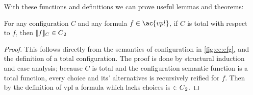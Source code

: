 With these functions and definitions we can prove useful lemmas and theorems:
%
\begin{theorem}
  \label{thm:vpltopl}
  For any configuration $C$ and any formula $f \in \ac{vpl}$, if $C$ is total
  with respect to $f$, then $\sem[C]{f} \in \pl{}$
\end{theorem}
%
\begin{proof}
  This follows directly from the semantics of configuration in
  \autoref{fig:cc:cfg}, and the definition of a total configuration. The proof
  is done by structural induction and case analysis; because $C$ is total and
  the configuration semantic function is a total function, every choice and its'
  alternatives is recursively reified for $f$. Then by the definition of
  \ac{vpl} a formula which lacks choices is $\in {C\textsubscript{2}}{}$.
\end{proof}


